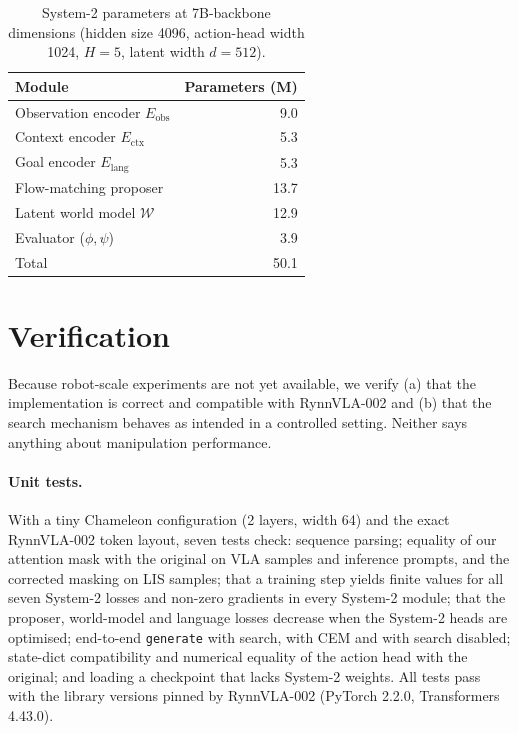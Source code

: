 \documentclass[11pt]{article}
\newcommand{\WM}{\mathcal{W}}
\begin{document}
\begin{table}[t]
\centering
\caption{System-2 parameters at 7B-backbone dimensions (hidden size 4096, action-head width 1024, $H{=}5$, latent width $d{=}512$).}
\label{tab:params}
\small
\begin{tabular}{lr}
\toprule
Module & Parameters (M) \\
\midrule
Observation encoder $E_{\mathrm{obs}}$ & 9.0 \\
Context encoder $E_{\mathrm{ctx}}$ & 5.3 \\
Goal encoder $E_{\mathrm{lang}}$ & 5.3 \\
Flow-matching proposer & 13.7 \\
Latent world model $\WM$ & 12.9 \\
Evaluator ($\phi,\psi$) & 3.9 \\
\midrule
Total & 50.1 \\
\bottomrule
\end{tabular}
\end{table}

\section{Verification}
\label{sec:verification}

Because robot-scale experiments are not yet available, we verify (a) that the implementation is correct and compatible with RynnVLA-002 and (b) that the search mechanism behaves as intended in a controlled setting. Neither says anything about manipulation performance.

\paragraph{Unit tests.} With a tiny Chameleon configuration (2 layers, width 64) and the exact RynnVLA-002 token layout, seven tests check: sequence parsing; equality of our attention mask with the original on VLA samples and inference prompts, and the corrected masking on LIS samples; that a training step yields finite values for all seven System-2 losses and non-zero gradients in every System-2 module; that the proposer, world-model and language losses decrease when the System-2 heads are optimised; end-to-end \texttt{generate} with search, with CEM and with search disabled; state-dict compatibility and numerical equality of the action head with the original; and loading a checkpoint that lacks System-2 weights. All tests pass with the library versions pinned by RynnVLA-002 (PyTorch 2.2.0, Transformers 4.43.0).
\end{document}
